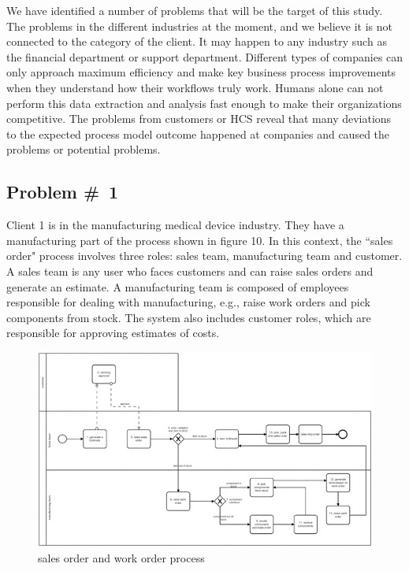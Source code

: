 We have identified a number of problems that will be the target of this study. The problems in the different industries at the moment, and we believe it is not connected to the category of the client. It may happen to any industry such as the financial department or support department. Different types of companies can only approach maximum efficiency and make key business process improvements when they understand how their workflows truly work. Humans alone can not perform this data extraction and analysis fast enough to make their organizations competitive. The problems from customers or HCS reveal that many deviations to the expected process model outcome happened at companies and caused the problems or potential problems.



\subsection{Problem \#~1}
Client 1 is in the manufacturing medical device industry. They have a manufacturing part of the process shown in figure 10. In this context, the “sales order" process involves three roles: sales team, manufacturing team and customer. A sales team is any user who faces customers and can raise sales orders and generate an estimate. A manufacturing team is composed of employees responsible for dealing with manufacturing, e.g., raise work orders and pick components from stock. The system also includes customer roles, which are responsible for approving estimates of costs.

\begin{figure}[!htb]
    \centering 
    \includegraphics[scale=0.9]{resource/soAndwo.png}
    \caption{sales order and work order process}
    \label{figure:soAndwo}
\end{figure}


